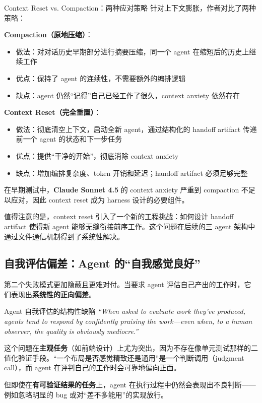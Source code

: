 \documentclass[a4paper]{article}
\begin{document}
\begin{knowledgebox}{Context Reset vs. Compaction：两种应对策略}
针对上下文膨胀，作者对比了两种策略：

\textbf{Compaction（原地压缩）}：
\begin{itemize}[leftmargin=1.5em]
    \item 做法：对对话历史早期部分进行摘要压缩，同一个 agent 在缩短后的历史上继续工作
    \item 优点：保持了 agent 的连续性，不需要额外的编排逻辑
    \item 缺点：agent 仍然``记得''自己已经工作了很久，context anxiety 依然存在
\end{itemize}

\textbf{Context Reset（完全重置）}：
\begin{itemize}[leftmargin=1.5em]
    \item 做法：彻底清空上下文，启动全新 agent，通过结构化的 handoff artifact 传递前一个 agent 的状态和下一步任务
    \item 优点：提供``干净的开始''，彻底消除 context anxiety
    \item 缺点：增加编排复杂度、token 开销和延迟；handoff artifact 必须足够完整
\end{itemize}

在早期测试中，\textbf{Claude Sonnet 4.5} 的 context anxiety 严重到 compaction 不足以应对，因此 context reset 成为 harness 设计的必要组件。
\end{knowledgebox}

值得注意的是，context reset 引入了一个新的工程挑战：如何设计 handoff artifact 使得新 agent 能够无缝衔接前序工作。这个问题在后续的三 agent 架构中通过文件通信机制得到了系统性解决。

\subsection{自我评估偏差：Agent 的``自我感觉良好''}

第二个失败模式更加隐蔽且更难对付。当要求 agent 评估自己产出的工作时，它们表现出\textbf{系统性的正向偏差}。

\begin{warningbox}{Agent 自我评估的结构性缺陷}
\textit{``When asked to evaluate work they've produced, agents tend to respond by confidently praising the work---even when, to a human observer, the quality is obviously mediocre.''}

这个问题在\textbf{主观任务}（如前端设计）上尤为突出，因为不存在像单元测试那样的二值化验证手段。``一个布局是否感觉精致还是通用''是一个判断调用（judgment call），而 agent 在评判自己的工作时会可靠地偏向正面。

但即使在\textbf{有可验证结果的任务}上，agent 在执行过程中仍然会表现出不良判断——例如忽略明显的 bug 或对``差不多能用''的实现放行。
\end{warningbox}
\end{document}
